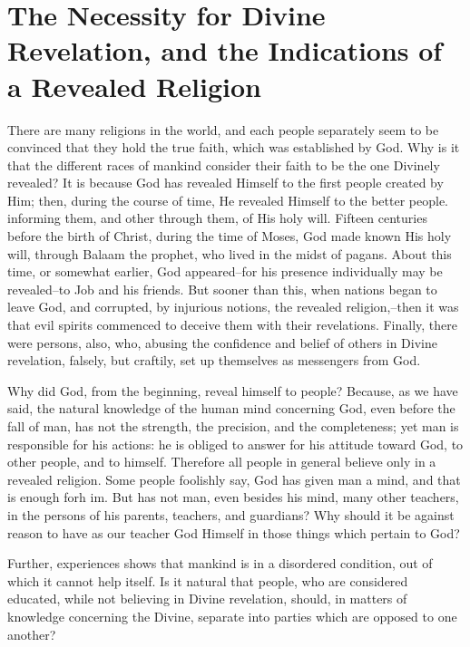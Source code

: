 \chapter{The Necessity for Divine Revelation, and the Indications of a Revealed Religion}

There are many religions in the world, and each people separately seem to be convinced that they hold the true faith, which was established by God. Why is it that the different races of mankind consider their faith to be the one Divinely revealed? It is because God has revealed Himself to the first people created by Him; then, during the course of time, He revealed Himself to the better people. informing them, and other through them, of His holy will. Fifteen centuries before the birth of Christ, during the time of Moses, God made known His holy will, through Balaam the prophet, who lived in the midst of pagans. About this time, or somewhat earlier, God appeared--for his presence individually may be revealed--to Job and his friends. But sooner than this, when nations began to leave God, and corrupted, by injurious notions, the revealed religion,--then it was that evil spirits commenced to deceive them with their revelations. Finally, there were persons, also, who, abusing the confidence and belief of others in Divine revelation, falsely, but craftily, set up themselves as messengers from God.

Why did God, from the beginning, reveal himself to people? Because, as we have said, the natural knowledge of the human mind concerning God, even before the fall of man, has not the strength, the precision, and the completeness; yet man is responsible for his actions: he is obliged to answer for his attitude toward God, to other people, and to himself. Therefore all people in general believe only in a revealed religion. Some people foolishly say, God has given man a mind, and that is enough forh im. But has not man, even besides his mind, many other teachers, in the persons of his parents, teachers, and guardians? Why should it be against reason to have as our teacher God Himself in those things which pertain to God?

Further, experiences shows that mankind is in a disordered condition, out of which it cannot help itself. Is it natural that people, who are considered educated, while not believing in Divine revelation, should, in matters of knowledge concerning the Divine, separate into parties which are opposed to one another?

